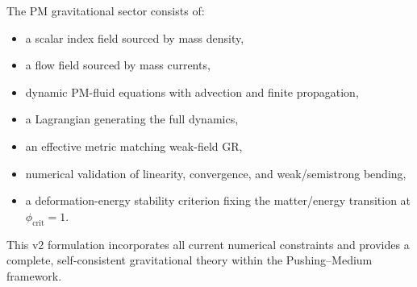 \documentclass{article}
\begin{document}
The PM gravitational sector consists of:

\begin{itemize}
    \item a scalar index field sourced by mass density,
    \item a flow field sourced by mass currents,
    \item dynamic PM-fluid equations with advection and finite propagation,
    \item a Lagrangian generating the full dynamics,
    \item an effective metric matching weak-field GR,
    \item numerical validation of linearity, convergence, and weak/semistrong bending,
    \item a deformation-energy stability criterion fixing the matter/energy transition at $\phi_{\mathrm{crit}} = 1$.
\end{itemize}

This v2 formulation incorporates all current numerical constraints and provides
a complete, self-consistent gravitational theory within the Pushing--Medium
framework.
\end{document}
